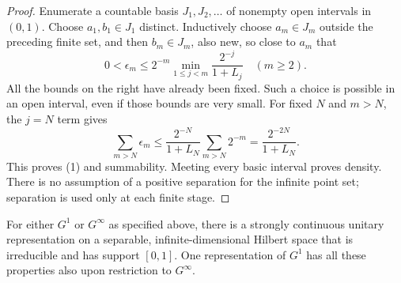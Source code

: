 \begin{proof}
Enumerate a countable basis $J_1,J_2,\ldots$ of nonempty open
intervals in $(0,1)$. Choose $a_1,b_1\in J_1$ distinct. Inductively
choose $a_m\in J_m$ outside the preceding finite set, and then
$b_m\in J_m$, also new, so close to $a_m$ that
\[
 0<\epsilon_m\leq 2^{-m}
       \min_{1\leq j<m}\frac{2^{-j}}{1+L_j}\quad(m\geq2).
 \tag{2}\label{eq:pairchoice}
\]
All the bounds on the right have already been fixed. Such a choice
is possible in an open interval, even if those bounds are very small.
For fixed $N$ and $m>N$, the $j=N$ term gives
\[
 \sum_{m>N}\epsilon_m
 \leq\frac{2^{-N}}{1+L_N}\sum_{m>N}2^{-m}
 =\frac{2^{-2N}}{1+L_N}.
\]
This proves (1) and summability. Meeting every basic interval proves
density. There is no assumption of a positive separation for the
infinite point set; separation is used only at each finite stage.
\end{proof}

\begin{theorem}\ours{}
\label{thm:interval-support}
For either $G^1$ or $G^\infty$ as specified above, there is a
strongly continuous unitary representation on a separable,
infinite-dimensional Hilbert space that is irreducible and has support
$[0,1]$. One representation of $G^1$ has all these properties also
upon restriction to $G^\infty$.
\end{theorem}

